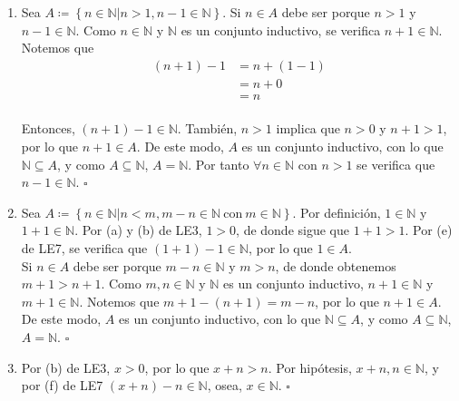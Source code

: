 \documentclass[11pt]{article}
\newcommand{\N}{\mathbb{N}}
\def\defined #1{\coloneqq \left\{#1\right\}}
\begin{document}
\begin{enumerate}[label=\alph*)]
    \item Sea $A \defined{n\in \N | n>1, n-1\in \N}$. Si $n\in A$ debe ser porque $n>1$ y $n-1\in \N$. Como $n\in \N$ y $\N$ es un conjunto inductivo, se verifica $n+1\in\N$. Notemos que \begin{align*}
        (n+1)-1 &= n+(1-1) \\
        &= n+ 0\\
        &= n
    \end{align*}\\
    Entonces, $(n+1)-1\in \N$. También, $n>1$ implica que $n>0$ y $n+1>1$, por lo que $n+1\in A$. De este modo, $A$ es un conjunto inductivo, con lo que $\N \subseteq A$, y como $A\subseteq \N$, $A=\N$. Por tanto $\forall n\in \N$ con $n>1$ se verifica que $n-1\in \N$. \mbox{}\hfill $\square$

    \item Sea $A \defined{n\in \N| n<m, m-n\in\N \ \text{con} \ m\in\N}$. Por definición, $1\in \N$ y $1+1\in \N$. Por (a) y (b) de LE3, $1>0$, de donde sigue que $1+1>1$. Por (e) de LE7, se verifica que $(1+1)-1\in \N$, por lo que $1\in A$. \\[5pt] Si $n \in A$ debe ser porque $m-n\in \N$ y $m>n$, de donde obtenemos $m+1>n+1$. Como $m,n\in \N$ y $\N$ es un conjunto inductivo, $n+1\in \N$ y $m+1 \in \N$. Notemos que $m+1-(n+1)=m-n$, por lo que $n+1\in A$. De este modo, $A$ es un conjunto inductivo, con lo que $\N \subseteq A$, y como $A\subseteq \N$, $A=\N$. \mbox{}\hfill $\square$ 
    
    
    \item Por (b) de LE3, $x>0$, por lo que $x+n>n$. Por hipótesis, $x+n, n\in \N$, y por (f) de LE7 $(x+n)-n \in \N$, osea, $x\in \N$. \mbox{}\hfill $\square$
    

\end{enumerate}
\end{document}

